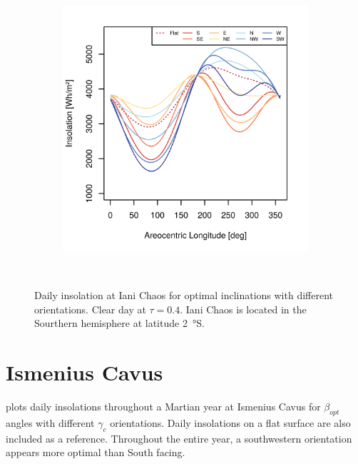\begin{figure}[h]
\begin{subfigure}[t]{\subfigureWidth}
            \includegraphics[height=\graphicsHeight]{sections/appendix/optimal-angles/plots/iani-chaos-tau-04-and-beta-optimal-based-on-solar-insolation.png}
            \label{fig:sub:optimal-angles-iani-chaos-based-on-insolation}
    \end{subfigure}\\[0.8ex]
    \caption[Daily insolation at Iani Chaos for optimal inclinations with different orientations]
    {Daily insolation at Iani Chaos for optimal inclinations with different orientations. Clear day at $\tau=0.4$. Iani Chaos is located in the Sourthern hemisphere at latitude \SI{2}{\degree}S.}
    \label{fig:plot:optimal-angles-iani-chaos}
\vspace{-2ex}
\end{figure}

\section{Ismenius Cavus}
\label{sec:Appendix:OptimalAngles:IsmeniusCavus}

 plots daily insolations throughout a Martian year at Ismenius Cavus for $\beta_{opt}$ angles with different $\gamma_{c}$ orientations. Daily insolations on a flat surface are also included as a reference. Throughout the entire year, a southwestern orientation appears more optimal than South facing.

